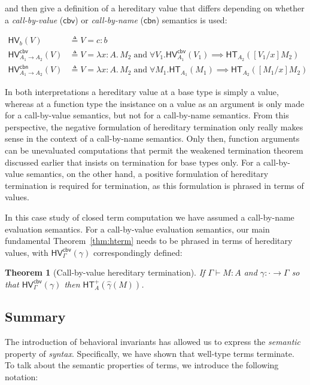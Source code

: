 \documentclass{article}
\newtheorem{thm}{Theorem}
\newcommand{\hasEF}[3]{\ensuremath{#1 \vdash #2 : #3}}
\newcommand{\hterm}[2]{\ensuremath{\mathsf{HT}_{#1}(#2)}}
\newcommand{\htermp}[2]{\ensuremath{\mathsf{HT}^+_{#1}(#2)}}
\newcommand{\hv}[2]{\ensuremath{\mathsf{HV}_{#1}(#2)}}
\newcommand{\hvcbn}[2]{\ensuremath{\mathsf{HV}^{\mathsf{cbn}}_{#1}(#2)}}
\newcommand{\hvcbv}[2]{\ensuremath{\mathsf{HV}^{\mathsf{cbv}}_{#1}(#2)}}
\newcommand{\fn}[2]{\ensuremath{#1 \to #2}}
\newcommand{\lam}[3]{\ensuremath{\lambda #1 {:} #2.\, #3}}
\begin{document}
\noindent and then give a definition of a hereditary value that differs depending on whether a \emph{call-by-value}
($\mathsf{cbv}$) or \emph{call-by-name} ($\mathsf{cbn}$) semantics is used:

\begin{align*}
\hv{b}{V} &\triangleq V = c : b \\
\hvcbv{\fn{A_1}{A_2}}{V} &\triangleq V = \lam{x}{A}{M_2} \; \text{and} \; \forall V_1. \hvcbv{A_1}{V_1} \implies
\hterm{A_2}{[V_1/x]M_2} \\
\hvcbn{\fn{A_1}{A_2}}{V} &\triangleq V = \lam{x}{A}{M_2} \; \text{and} \; \forall M_1. \hterm{A_1}{M_1} \implies
\hterm{A_2}{[M_1/x]M_2}
\end{align*}

In both interpretations a hereditary value at a base type is simply a value, whereas at a
function type the insistance on a value as an argument is only made for a call-by-value
semantics, but not for a call-by-name semantics.  From this perspective, the negative
formulation of hereditary termination only really makes sense in the context of a call-by-name
semantics.  Only then, function arguments can be unevaluated computations that permit the weakened
termination theorem discussed earlier that insists on termination for base types only.  For a
call-by-value semantics, on the other hand, a positive formulation of hereditary termination is
required for termination, as this formulation is phrased in terms of values.

In this case study of closed term computation we have assumed a call-by-name evaluation
semantics.  For a call-by-value evaluation semantics, our main fundamental
Theorem~\ref{thm:hterm} needs to be phrased in terms of hereditary values, with
$\hvcbv{\Gamma}{\gamma}$ correspondingly defined:

\begin{thm}[Call-by-value hereditary termination]\label{thm:hcbvterm}
  If $\hasEF{\Gamma}{M}{A}$ and $\gamma : \cdot \to \Gamma$ so that
  $\hvcbv{\Gamma}{\gamma}$ then $\htermp{A}{\hat{\gamma}(M)}$.
\end{thm}

\subsection{Summary}

The introduction of behavioral invariants has allowed us to express the \emph{semantic}
property of \emph{syntax}.  Specifically, we have shown that well-type terms terminate.  To
talk about the semantic properties of terms, we introduce the following notation:
\end{document}
